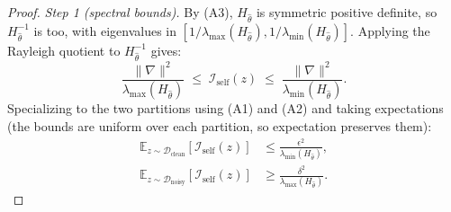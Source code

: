 \begin{foldable}
\begin{proof}
        \textit{Step 1 (spectral bounds).}
        By (A3), $H_{\hat\theta}$ is symmetric positive definite, so $H_{\hat\theta}^{-1}$ is too, with eigenvalues in $[1/\lambda_{\max}(H_{\hat\theta}), 1/\lambda_{\min}(H_{\hat\theta})]$.
        Applying the Rayleigh quotient to $H_{\hat\theta}^{-1}$ gives:
        \begin{equation}
            \frac{\|\nabla\|^2}{\lambda_{\max}(H_{\hat\theta})}
            \;\leq\; \mathcal{I}_\text{self}(z)
            \;\leq\; \frac{\|\nabla\|^2}{\lambda_{\min}(H_{\hat\theta})}.
        \end{equation}
        Specializing to the two partitions using (A1) and (A2) and taking expectations (the bounds are uniform over each partition, so expectation preserves them):
        \begin{align}
            \mathbb{E}_{z \sim \mathcal{D}_\text{clean}}[\mathcal{I}_\text{self}(z)]
            &\leq \frac{\epsilon^2}{\lambda_{\min}(H_{\hat\theta})}, \\
            \mathbb{E}_{z \sim \mathcal{D}_\text{noisy}}[\mathcal{I}_\text{self}(z)]
            &\geq \frac{\delta^2}{\lambda_{\max}(H_{\hat\theta})}.
        \end{align}


\end{proof}
\end{foldable}

